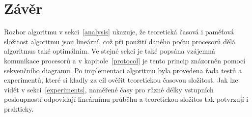 \documentclass[a4paper, 12pt]{article}[21.3.2015]
\begin{document}
\section{Závěr}\label{conclusion}
Rozbor algoritmu v sekci~\ref{analysis} ukazuje, že teoretická časová i paměťová složitost algoritmu jsou lineární, což při použití daného počtu procesorů dělá algoritmus také optimálním. Ve stejné sekci je také popsána vzájemná komunikace procesorů a v kapitole~\ref{protocol} je tento princip znázorněn pomocí sekvenčního diagramu. Po implementaci algoritmu byla provedena řada testů a experimentů, které si kladly za cíl ověřit teoretickou časovou složitost. Jak lze vidět v sekci~\ref{experiments}, naměřené časy pro různé délky vstupních posloupností odpovídají lineárnímu průběhu a teoretickou složitos tak potvrzují i prakticky.
\end{document}
